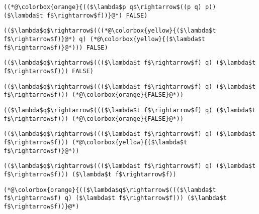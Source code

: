 \documentclass{beamer}
\begin{document}
\begin{frame}[fragile]{\CurrentSection}
\lstset{basicstyle=\ttfamily\small}\lstset{numbers=none}\lstset{language=ML}\begin{lstlisting}
((*@\colorbox{orange}{(($\lambda$p q$\rightarrow$((p q) p)) ($\lambda$t f$\rightarrow$f))}@*) FALSE)
\end{lstlisting}
\pause\lstset{language=ML}\begin{lstlisting}
(($\lambda$q$\rightarrow$(((*@\colorbox{yellow}{($\lambda$t f$\rightarrow$f)}@*) q) (*@\colorbox{yellow}{($\lambda$t f$\rightarrow$f)}@*))) FALSE)
\end{lstlisting}

\end{frame}

\begin{frame}[fragile]{\CurrentSection}
\lstset{basicstyle=\ttfamily\small}\lstset{numbers=none}\lstset{language=ML}\begin{lstlisting}
(($\lambda$q$\rightarrow$((($\lambda$t f$\rightarrow$f) q) ($\lambda$t f$\rightarrow$f))) FALSE)
\end{lstlisting}
\pause\lstset{language=ML}\begin{lstlisting}
(($\lambda$q$\rightarrow$((($\lambda$t f$\rightarrow$f) q) ($\lambda$t f$\rightarrow$f))) (*@\colorbox{orange}{FALSE}@*))
\end{lstlisting}

\end{frame}

\begin{frame}[fragile]{\CurrentSection}
\lstset{basicstyle=\ttfamily\small}\lstset{numbers=none}\lstset{language=ML}\begin{lstlisting}
(($\lambda$q$\rightarrow$((($\lambda$t f$\rightarrow$f) q) ($\lambda$t f$\rightarrow$f))) (*@\colorbox{orange}{FALSE}@*))
\end{lstlisting}
\pause\lstset{language=ML}\begin{lstlisting}
(($\lambda$q$\rightarrow$((($\lambda$t f$\rightarrow$f) q) ($\lambda$t f$\rightarrow$f))) (*@\colorbox{yellow}{($\lambda$t f$\rightarrow$f)}@*))
\end{lstlisting}

\end{frame}

\begin{frame}[fragile]{\CurrentSection}
\lstset{basicstyle=\ttfamily\small}\lstset{numbers=none}\lstset{language=ML}\begin{lstlisting}
(($\lambda$q$\rightarrow$((($\lambda$t f$\rightarrow$f) q) ($\lambda$t f$\rightarrow$f))) ($\lambda$t f$\rightarrow$f))
\end{lstlisting}
\pause\lstset{language=ML}\begin{lstlisting}
(*@\colorbox{orange}{(($\lambda$q$\rightarrow$((($\lambda$t f$\rightarrow$f) q) ($\lambda$t f$\rightarrow$f))) ($\lambda$t f$\rightarrow$f))}@*)
\end{lstlisting}

\end{frame}
\end{document}
